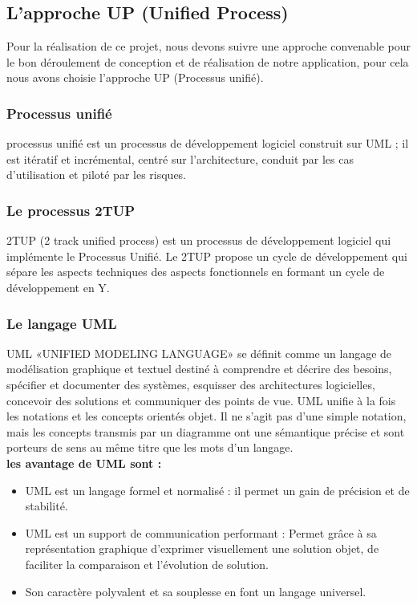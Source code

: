 \subsection{L’approche UP (Unified Process) }
\par Pour la réalisation de ce projet, nous devons suivre une approche convenable pour le bon déroulement de conception et de réalisation de notre application, pour cela nous avons choisie l’approche UP (Processus unifié).
\subsubsection{Processus unifié }
\parUn processus unifié est un processus de développement logiciel construit sur UML ; il est itératif et incrémental, centré sur l’architecture, conduit par les cas d’utilisation et piloté par les risques.\cite{ref2}
\subsubsection{Le processus 2TUP }
\par 2TUP (2 track unified process) est un processus de développement logiciel qui implémente le Processus Unifié. Le 2TUP propose un cycle de développement qui sépare les aspects techniques des aspects fonctionnels en formant un cycle de développement en Y.\cite{ref2}
\subsubsection{Le langage UML }
\par UML «UNIFIED MODELING LANGUAGE» se définit comme un langage de modélisation graphique et textuel destiné à comprendre et décrire des besoins, spécifier et documenter des systèmes, esquisser des architectures logicielles, concevoir des solutions et communiquer des points de vue. UML unifie à la fois les notations et les concepts orientés objet. Il ne s’agit pas d’une simple notation, mais les concepts transmis par un diagramme ont une sémantique précise et sont porteurs de sens au même titre que les mots d’un langage.\cite{ref2}\\
\textbf{les avantage  de UML sont :}
\begin{itemize}[label=\textbullet]
    \item UML est un langage formel et normalisé : il permet un gain de précision et de stabilité.
    \item UML est un support de communication performant :
    Permet grâce à sa représentation graphique d'exprimer visuellement une solution objet, de faciliter la comparaison et l'évolution de solution.
    \item Son caractère polyvalent et sa souplesse en font un langage universel.
\end{itemize}
